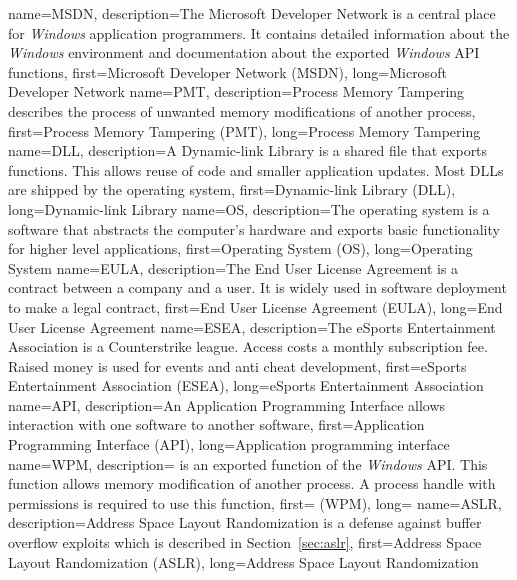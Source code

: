 {
  name={MSDN},
  description={The Microsoft Developer Network is a central place for \emph{Windows} application programmers. It contains detailed information about the \emph{Windows} environment and documentation about the exported \emph{Windows} API functions},
  first={Microsoft Developer Network (MSDN)},
  long={Microsoft Developer Network}
}
{
  name={PMT},
  description={Process Memory Tampering describes the process of unwanted memory modifications of another process},
  first={Process Memory Tampering (PMT)},
  long={Process Memory Tampering}
}
{
  name={DLL},
  description={A Dynamic-link Library is a shared file that exports functions. This allows reuse of code and smaller application updates. Most DLLs are shipped by the operating system},
  first={Dynamic-link Library (DLL)},
  long={Dynamic-link Library}
}
{
  name={OS},
  description={The operating system is a software that abstracts the computer's hardware and exports basic functionality for higher level applications},
  first={Operating System (OS)},
  long={Operating System}
}
{
  name={EULA},
  description={The End User License Agreement is a contract between a company and a user. It is widely used in software deployment to make a legal contract},
  first={End User License Agreement (EULA)},
  long={End User License Agreement}
}
{
  name={ESEA},
  description={The eSports Entertainment Association is a Counterstrike league. Access costs a monthly subscription fee. Raised money is used for events and anti cheat development},
  first={eSports Entertainment Association (ESEA)},
  long={eSports Entertainment Association}
}
{
  name={API},
  description={An Application Programming Interface allows interaction with one software to another software},
  first={Application Programming Interface (API)},
  long={Application programming interface}
}
{
  name={WPM},
  description={ is an exported function of the \emph{Windows} API. This function allows memory modification of another process. A process handle with  permissions is required to use this function},
  first={ (WPM)},
  long={}
}
{
  name={ASLR},
  description={Address Space Layout Randomization is a defense against buffer overflow exploits which is described in Section~\ref{sec:aslr}},
  first={Address Space Layout Randomization (ASLR)},
  long={Address Space Layout Randomization}
}
